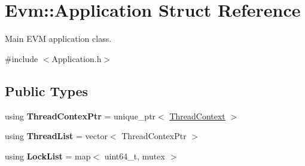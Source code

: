 \hypertarget{struct_evm_1_1_application}{}\section{Evm\+:\+:Application Struct Reference}
\label{struct_evm_1_1_application}


Main E\+VM application class.  




{\ttfamily \#include $<$Application.\+h$>$}

\subsection*{Public Types}
\begin{DoxyCompactItemize}
\item 
\mbox{\label{struct_evm_1_1_application_aadbcc3dd7f4464ecb028bc5692cde348}} 
using {\bfseries Thread\+Contex\+Ptr} = unique\+\_\+ptr$<$ \mbox{\hyperlink{struct_evm_1_1_thread_context}{Thread\+Context}} $>$
\item 
\mbox{\label{struct_evm_1_1_application_ad36d3ad5af0c655ce793abe07a241e5d}} 
using {\bfseries Thread\+List} = vector$<$ Thread\+Contex\+Ptr $>$
\item 
\mbox{\label{struct_evm_1_1_application_acf0318d8baa36b9ea02f89c6f2d99874}} 
using {\bfseries Lock\+List} = map$<$ uint64\+\_\+t, mutex $>$
\end{DoxyCompactItemize}
